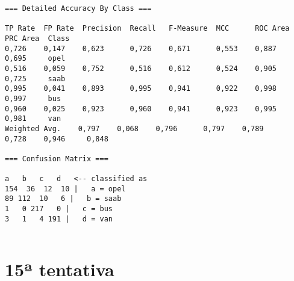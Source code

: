 \documentclass[
	article,			%
	11pt,				%
	oneside,			%
	a4paper,			%
	english,			%
	brazil,				%
	sumario=tradicional
	]{abntex2}
\begin{document}
\begin{lstlisting}
=== Detailed Accuracy By Class ===

TP Rate  FP Rate  Precision  Recall   F-Measure  MCC      ROC Area  PRC Area  Class
0,726    0,147    0,623      0,726    0,671      0,553    0,887     0,695     opel
0,516    0,059    0,752      0,516    0,612      0,524    0,905     0,725     saab
0,995    0,041    0,893      0,995    0,941      0,922    0,998     0,997     bus
0,960    0,025    0,923      0,960    0,941      0,923    0,995     0,981     van
Weighted Avg.    0,797    0,068    0,796      0,797    0,789      0,728    0,946     0,848     

=== Confusion Matrix ===

a   b   c   d   <-- classified as
154  36  12  10 |   a = opel
89 112  10   6 |   b = saab
1   0 217   0 |   c = bus
3   1   4 191 |   d = van


\end{lstlisting}

\section{15ª tentativa}
\end{document}
